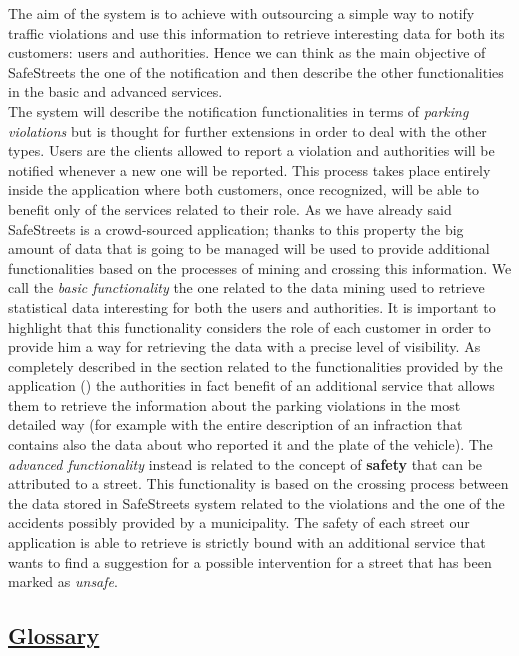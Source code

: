		The aim of the system is to achieve with outsourcing a simple way to notify traffic violations and use this information to retrieve interesting data for both its customers: users and authorities. Hence we can think as the main objective of SafeStreets the one of the notification and then describe the other functionalities in the basic and advanced services.\\
		
		The system will describe the notification functionalities in terms of \emph{parking violations} but is thought for further extensions in order to deal with the other types. Users are the clients allowed to report a violation and authorities will be notified whenever a new one will be reported. This process takes place entirely inside the application where both customers, once recognized, will be able to benefit only of the services related to their role. As we have already said SafeStreets is a crowd-sourced application; thanks to this property the big amount of data that is going to be managed will be used to provide additional functionalities based on the processes of mining and crossing this information. We call the \emph{basic functionality} the one related to the data mining used to retrieve statistical data interesting for both the users and authorities. It is important to highlight that this functionality considers the role of each customer in order to provide him a way for retrieving the data with a precise level of visibility. As completely described in the section related to the functionalities provided by the application () the authorities in fact benefit of an additional service that allows them to retrieve the information about the parking violations in the most detailed way (for example with the entire description of an infraction that contains also the data about who reported it and the plate of the vehicle). The \emph{advanced functionality} instead is related to the concept of \textbf{safety} that can be attributed to a street. This functionality is based on the crossing process between the data stored in SafeStreets system related to the violations and the one of the accidents possibly provided by a municipality. The safety of each street our application is able to retrieve is strictly bound with an additional service that wants to find a suggestion for a possible intervention for a street that has been marked as \emph{unsafe}.
			
	\subsection[Glossary]{\hyperlink{toc}{Glossary}}
		\label{sec:glossary}
		
